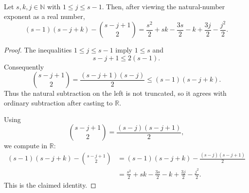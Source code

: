 \begin{helper}
Let \(s,k,j\in\mathbb N\) with \(1\le j\le s-1\). Then, after viewing the
natural-number exponent as a real number,
\[
  (s-1)(s-j+k)-\binom{s-j+1}{2}
  =
  \frac{s^2}{2}+sk-\frac{3s}{2}-k+\frac{3j}{2}-\frac{j^2}{2}.
\]
\end{helper}
\begin{proof}
The inequalities \(1\le j\le s-1\) imply \(1\le s\) and
\[
  s-j+1\le 2(s-1).
\]
Consequently
\[
  \binom{s-j+1}{2}
  =\frac{(s-j+1)(s-j)}2
  \le (s-1)(s-j+k).
\]
Thus the natural subtraction on the left is not truncated, so it agrees with
ordinary subtraction after casting to \(\mathbb R\).

Using
\[
  \binom{s-j+1}{2}=\frac{(s-j)(s-j+1)}2,
\]
we compute in \(\mathbb R\):
\[
\begin{aligned}
  (s-1)(s-j+k)-\binom{s-j+1}{2}
  &=(s-1)(s-j+k)-\frac{(s-j)(s-j+1)}2  \\
  &=\frac{s^2}{2}+sk-\frac{3s}{2}-k+\frac{3j}{2}-\frac{j^2}{2}.
\end{aligned}
\]
This is the claimed identity.
\end{proof}
